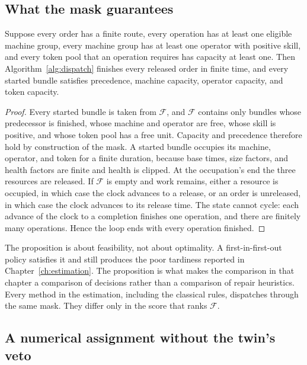 \subsection{What the mask guarantees}

\begin{proposition}
\label{prop:mask}
Suppose every order has a finite route, every operation has at least one eligible machine group, every machine group has at least one operator with positive skill, and every token pool that an operation requires has capacity at least one. Then Algorithm~\ref{alg:dispatch} finishes every released order in finite time, and every started bundle satisfies precedence, machine capacity, operator capacity, and token capacity.
\end{proposition}

\begin{proof}
Every started bundle is taken from \(\mathcal{F}\), and \(\mathcal{F}\) contains only bundles whose predecessor is finished, whose machine and operator are free, whose skill is positive, and whose token pool has a free unit. Capacity and precedence therefore hold by construction of the mask. A started bundle occupies its machine, operator, and token for a finite duration, because base times, size factors, and health factors are finite and health is clipped. At the occupation's end the three resources are released. If \(\mathcal{F}\) is empty and work remains, either a resource is occupied, in which case the clock advances to a release, or an order is unreleased, in which case the clock advances to its release time. The state cannot cycle: each advance of the clock to a completion finishes one operation, and there are finitely many operations. Hence the loop ends with every operation finished.
\end{proof}

The proposition is about feasibility, not about optimality. A first-in-first-out policy satisfies it and still produces the poor tardiness reported in Chapter~\ref{ch:estimation}. The proposition is what makes the comparison in that chapter a comparison of decisions rather than a comparison of repair heuristics. Every method in the estimation, including the classical rules, dispatches through the same mask. They differ only in the score that ranks \(\mathcal{F}\).

\subsection{A numerical assignment without the twin's veto}

